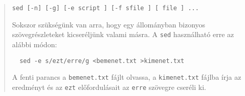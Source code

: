 % 
\noindent{}
\begin{quotation}
\hfill\texttt{sed [-n] [-g] [-e script ] [-f sfile ] [ file ] ...}\bigskip






Sokszor szükségünk van arra, hogy egy állományban bizonyos szövegrészleteket kicseréljünk valami másra. 
  A \verb.sed. használható erre az alábbi módon:

  \begin{lstlisting}
  sed -e s/ezt/erre/g <bemenet.txt >kimenet.txt
  \end{lstlisting}
  A fenti parancs a \texttt{bemenet.txt} fájlt olvassa, a \texttt{kimenet.txt} fájlba írja az eredményt 
  és az \texttt{ezt} előfordulásait az \texttt{erre} szövegre cseréli ki.

  
\end{quotation}




